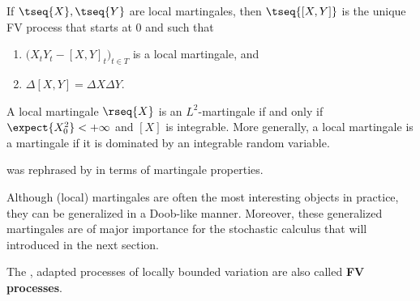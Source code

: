     \begin{property}[Covariation]\label{stoch:covariation}
        If $\tseq{X},\tseq{Y}$ are local martingales, then $\tseq{[X,Y]}$ is the unique FV process that starts at 0 and such that
        \begin{enumerate}
            \item $\bigl(X_tY_t - [X,Y]_t\bigr)_{t\in T}$ is a local martingale, and
            \item $\Delta[X,Y] = \Delta X\Delta Y$.
        \end{enumerate}
    \end{property}

    \begin{property}
        A local martingale $\rseq{X}$ is an $L^2$-martingale if and only if $\expect{X_0^2}<+\infty$ and $[X]$ is integrable. More generally, a local martingale is a martingale if it is dominated by an integrable random variable.
    \end{property}

     was rephrased by  in terms of martingale properties.

    Although (local) martingales are often the most interesting objects in practice, they can be generalized in a Doob-like manner. Moreover, these generalized martingales are of major importance for the stochastic calculus that will introduced in the next section.
    \begin{remark}
        The \cdlgg, adapted processes of locally bounded variation are also called \textbf{FV processes}.
    \end{remark}

